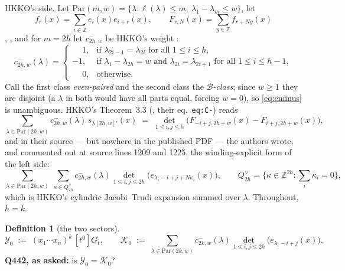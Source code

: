 \documentclass[11pt]{article}
\theoremstyle{plain}
\theoremstyle{definition}
\newtheorem{definition}[theorem]{Definition}
\newcommand{\Par}{\mathrm{Par}}
\newcommand{\Z}{\mathbb{Z}}
\begin{document}
HKKO's side.  Let $\Par(m,w)=\{\lambda:\ell(\lambda)\le m,\ \lambda_1-\lambda_m\le w\}$,
let
\begin{equation}\label{eq:fF}
  f_r(x)=\sum_{i\in\Z}e_i(x)e_{i+r}(x),\qquad
  F_{r,N}(x)=\sum_{y\in\Z}f_{r+Ny}(x)
\end{equation}
\cite[Thm.~1.4, source line 1103]{HKKO}, \cite[\texttt{Eq\_FiN}, source line 2214]{W}, and
for $m=2h$ let $c^-_{2h,w}$ be HKKO's weight \cite[Eq.~(3.5), \texttt{eq:wt\_C}]{HKKO}:
\begin{equation}\label{eq:cminus}
  c^-_{2h,w}(\lambda)=
  \begin{cases}
    \phantom{-}1, & \text{if }\lambda_{2i-1}=\lambda_{2i}\text{ for all }1\le i\le h,\\
    -1, & \text{if }\lambda_1-\lambda_{2h}=w\text{ and }\lambda_{2i}=\lambda_{2i+1}
          \text{ for all }1\le i\le h-1,\\
    \phantom{-}0,&\text{otherwise.}
  \end{cases}
\end{equation}
Call the first class \emph{even-paired} and the second class the \emph{$\mathcal B$-class};
since $w\ge1$ they are disjoint (a $\lambda$ in both would have all parts equal, forcing
$w=0$), so \eqref{eq:cminus} is unambiguous.  HKKO's Theorem~3.3
(\cite[\texttt{thm:C}, source line 1186]{HKKO}, their eq.~\texttt{eq:C-}) reads
\begin{equation}\label{eq:C-}
  \sum_{\lambda\in\Par(2h,w)}c^-_{2h,w}(\lambda)\,s_{\lambda[2h,w]'}(x)
  \;=\;\det_{1\le i,j\le h}\bigl(F_{-i+j,2h+w}(x)-F_{i+j,2h+w}(x)\bigr),
\end{equation}
and in their source --- but nowhere in the published PDF --- the authors wrote, and
commented out at source lines 1209 and 1225, the winding-explicit form of the left side:
\begin{equation}\label{eq:commented}
  \sum_{\lambda\in\Par(2h,w)}\ \sum_{\kappa\in Q^\vee_{2h}}c^-_{2h,w}(\lambda)
  \det_{1\le i,j\le 2h}\bigl(e_{\lambda_i-i+j+N\kappa_i}(x)\bigr),
  \qquad Q^\vee_{2h}=\{\kappa\in\Z^{2h}:\textstyle\sum_i\kappa_i=0\},
\end{equation}
which is HKKO's cylindric Jacobi--Trudi expansion \cite[Rem.~1.5(3)]{HKKO} summed over
$\lambda$.  Throughout, $h=k$.

\begin{definition}[the two sectors]\label{def:sectors}
\[
  \mathcal Y_0 \;:=\; (x_1\cdots x_n)^k\,[t^0]G_t,
  \qquad
  \mathcal K_0 \;:=\; \sum_{\lambda\in\Par(2k,w)}c^-_{2k,w}(\lambda)
     \det_{1\le i,j\le 2k}\bigl(e_{\lambda_i-i+j}(x)\bigr).
\]
\textbf{Q442, as asked:} is $\mathcal Y_0=\mathcal K_0$?
\end{definition}
\end{document}
